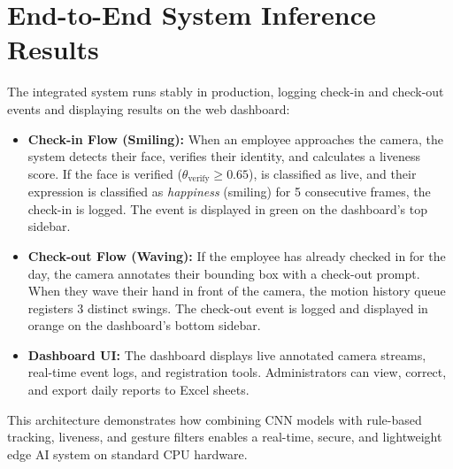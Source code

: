 \section{End-to-End System Inference Results}
The integrated system runs stably in production, logging check-in and check-out events and displaying results on the web dashboard:
\begin{itemize}
    \item \textbf{Check-in Flow (Smiling):} When an employee approaches the camera, the system detects their face, verifies their identity, and calculates a liveness score. If the face is verified ($\theta_{\text{verify}} \ge 0.65$), is classified as live, and their expression is classified as \textit{happiness} (smiling) for 5 consecutive frames, the check-in is logged. The event is displayed in green on the dashboard's top sidebar.
    \item \textbf{Check-out Flow (Waving):} If the employee has already checked in for the day, the camera annotates their bounding box with a check-out prompt. When they wave their hand in front of the camera, the motion history queue registers 3 distinct swings. The check-out event is logged and displayed in orange on the dashboard's bottom sidebar.
    \item \textbf{Dashboard UI:} The dashboard displays live annotated camera streams, real-time event logs, and registration tools. Administrators can view, correct, and export daily reports to Excel sheets.
\end{itemize}
This architecture demonstrates how combining CNN models with rule-based tracking, liveness, and gesture filters enables a real-time, secure, and lightweight edge AI system on standard CPU hardware.
